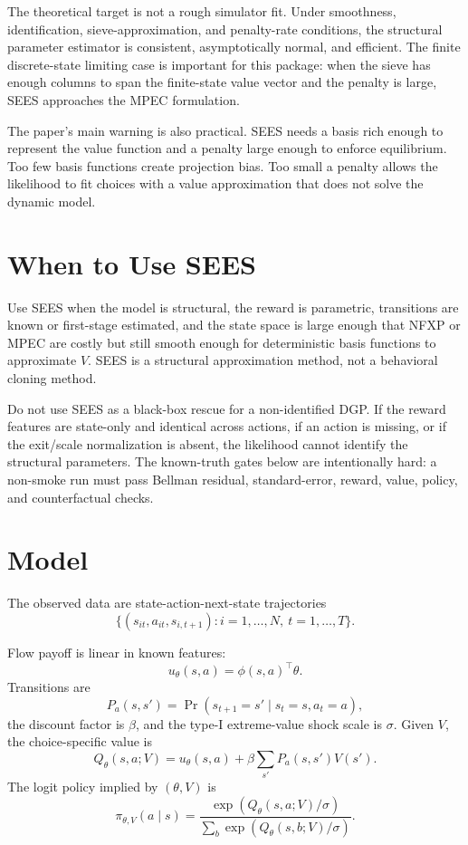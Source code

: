 \documentclass[10pt]{article}
\begin{document}
The theoretical target is not a rough simulator fit. Under smoothness,
identification, sieve-approximation, and penalty-rate conditions, the
structural parameter estimator is consistent, asymptotically normal, and
efficient. The finite discrete-state limiting case is important for this
package: when the sieve has enough columns to span the finite-state value
vector and the penalty is large, SEES approaches the MPEC formulation.

The paper's main warning is also practical. SEES needs a basis rich enough to
represent the value function and a penalty large enough to enforce
equilibrium. Too few basis functions create projection bias. Too small a
penalty allows the likelihood to fit choices with a value approximation that
does not solve the dynamic model.

\section{When to Use SEES}

Use SEES when the model is structural, the reward is parametric, transitions
are known or first-stage estimated, and the state space is large enough that
NFXP or MPEC are costly but still smooth enough for deterministic basis
functions to approximate \(V\). SEES is a structural approximation method, not
a behavioral cloning method.

Do not use SEES as a black-box rescue for a non-identified DGP. If the reward
features are state-only and identical across actions, if an action is missing,
or if the exit/scale normalization is absent, the likelihood cannot identify
the structural parameters. The known-truth gates below are intentionally hard:
a non-smoke run must pass Bellman residual, standard-error, reward, value,
policy, and counterfactual checks.

\section{Model}

The observed data are state-action-next-state trajectories
\[
\{(s_{it}, a_{it}, s_{i,t+1}) : i=1,\ldots,N,\ t=1,\ldots,T\}.
\]

Flow payoff is linear in known features:
\[
u_\theta(s,a) = \phi(s,a)^\top \theta.
\]
Transitions are
\[
P_a(s,s') = \Pr(s_{t+1}=s' \mid s_t=s, a_t=a),
\]
the discount factor is \(\beta\), and the type-I extreme-value shock scale is
\(\sigma\). Given \(V\), the choice-specific value is
\[
Q_\theta(s,a;V)
=
u_\theta(s,a)
+ \beta\sum_{s'}P_a(s,s')V(s').
\]
The logit policy implied by \((\theta,V)\) is
\[
\pi_{\theta,V}(a\mid s)
=
\frac{\exp(Q_\theta(s,a;V)/\sigma)}
{\sum_b \exp(Q_\theta(s,b;V)/\sigma)}.
\]
\end{document}
